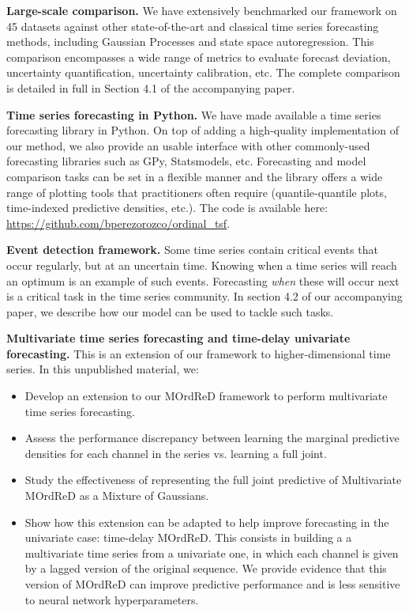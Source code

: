 \documentclass[pdftex,12pt,a4paper]{article}
\theoremstyle{definition}
\theoremstyle{remark}
\begin{document}
\textbf{Large-scale comparison.} We have extensively benchmarked our framework on 45 datasets against other state-of-the-art and classical time series forecasting methods, including Gaussian Processes and state space autoregression. This comparison encompasses a wide range of metrics to evaluate forecast deviation, uncertainty quantification, uncertainty calibration, etc. The complete comparison is detailed in full in Section 4.1 of the accompanying paper.

\textbf{Time series forecasting in Python.} We have made available a time series forecasting library in Python. On top of adding a high-quality implementation of our method, we also provide an usable interface with other commonly-used forecasting libraries such as GPy, Statsmodels, etc. Forecasting and model comparison tasks can be set in a flexible manner and the library offers a wide range of plotting tools that practitioners often require (quantile-quantile plots, time-indexed predictive densities, etc.). The code is available here: \url{https://github.com/bperezorozco/ordinal_tsf}.

\textbf{Event detection framework.} Some time series contain critical events that occur regularly, but at an uncertain time. Knowing when a time series will reach an optimum is an example of such events. Forecasting \textit{when} these will occur next is a critical task in the time series community. In section 4.2 of our accompanying paper, we describe how our model can be used to tackle such tasks.

\textbf{Multivariate time series forecasting and time-delay univariate forecasting.} This is an extension of our framework to higher-dimensional time series. In this unpublished material, we:
\begin{itemize}
    \item Develop an extension to our MOrdReD framework to perform multivariate time series forecasting.
    \item Assess the performance discrepancy between learning the marginal predictive densities for each channel in the series vs. learning a full joint.
    \item Study the effectiveness of representing the full joint predictive of Multivariate MOrdReD as a Mixture of Gaussians.
    \item Show how this extension can be adapted to help improve forecasting in the univariate case: time-delay MOrdReD. This consists in building a a multivariate time series from a univariate one, in which each channel is given by a lagged version of the original sequence. We provide evidence that this version of MOrdReD can improve predictive performance and is less sensitive to neural network hyperparameters.
\end{itemize}
\end{document}
